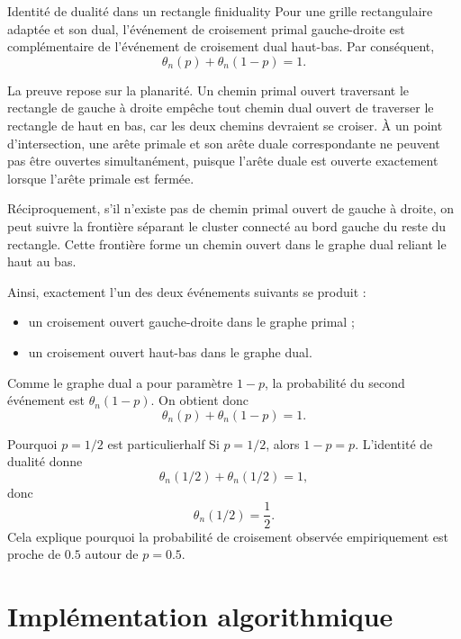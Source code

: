 \documentclass[11pt,a4paper]{report}
\newenvironment{proofbox}
{\begin{tcolorbox}[colback=grisclair,colframe=black!25,title=\textbf{Démonstration},fonttitle=\bfseries,sharp corners,boxrule=0.6pt]}
{\end{tcolorbox}}
\begin{document}
\begin{theorembox}{Identité de dualité dans un rectangle fini}{duality}
Pour une grille rectangulaire adaptée et son dual, l'événement de croisement primal gauche-droite est complémentaire de l'événement de croisement dual haut-bas. Par conséquent,
\[
\theta_n(p)+\theta_n(1-p)=1.
\]
\end{theorembox}

\begin{proofbox}
La preuve repose sur la planarité. Un chemin primal ouvert traversant le rectangle de gauche à droite empêche tout chemin dual ouvert de traverser le rectangle de haut en bas, car les deux chemins devraient se croiser. À un point d'intersection, une arête primale et son arête duale correspondante ne peuvent pas être ouvertes simultanément, puisque l'arête duale est ouverte exactement lorsque l'arête primale est fermée.

Réciproquement, s'il n'existe pas de chemin primal ouvert de gauche à droite, on peut suivre la frontière séparant le cluster connecté au bord gauche du reste du rectangle. Cette frontière forme un chemin ouvert dans le graphe dual reliant le haut au bas.

Ainsi, exactement l'un des deux événements suivants se produit :
\begin{itemize}
    \item un croisement ouvert gauche-droite dans le graphe primal ;
    \item un croisement ouvert haut-bas dans le graphe dual.
\end{itemize}
Comme le graphe dual a pour paramètre $1-p$, la probabilité du second événement est $\theta_n(1-p)$. On obtient donc
\[
\theta_n(p)+\theta_n(1-p)=1.
\]
\end{proofbox}

\begin{remarkbox}{Pourquoi $p=1/2$ est particulier}{half}
Si $p=1/2$, alors $1-p=p$. L'identité de dualité donne
\[
\theta_n(1/2)+\theta_n(1/2)=1,
\]
donc
\[
\theta_n(1/2)=\frac12.
\]
Cela explique pourquoi la probabilité de croisement observée empiriquement est proche de $0.5$ autour de $p=0.5$.
\end{remarkbox}

\chapter{Implémentation algorithmique}
\end{document}
